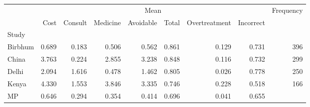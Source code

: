 \begin{table}[!h]
\centering
\begin{tabular}{lllllllll}
\cline{1-9}
\multicolumn{1}{c}{} &
  \multicolumn{7}{|c}{Mean} &
  \multicolumn{1}{r}{Frequency} \\
\multicolumn{1}{c}{} &
  \multicolumn{1}{|r}{Cost} &
  \multicolumn{1}{r}{Consult} &
  \multicolumn{1}{r}{Medicine} &
  \multicolumn{1}{r}{Avoidable} &
  \multicolumn{1}{r}{Total} &
  \multicolumn{1}{r}{Overtreatment} &
  \multicolumn{1}{r}{Incorrect} &
  \multicolumn{1}{r}{} \\
\cline{1-9}
\multicolumn{1}{l}{Study} &
  \multicolumn{1}{|r}{} &
  \multicolumn{1}{r}{} &
  \multicolumn{1}{r}{} &
  \multicolumn{1}{r}{} &
  \multicolumn{1}{r}{} &
  \multicolumn{1}{r}{} &
  \multicolumn{1}{r}{} &
  \multicolumn{1}{r}{} \\
\multicolumn{1}{l}{\hspace{1em}Birbhum} &
  \multicolumn{1}{|r}{0.689} &
  \multicolumn{1}{r}{0.183} &
  \multicolumn{1}{r}{0.506} &
  \multicolumn{1}{r}{0.562} &
  \multicolumn{1}{r}{0.861} &
  \multicolumn{1}{r}{0.129} &
  \multicolumn{1}{r}{0.731} &
  \multicolumn{1}{r}{396} \\
\multicolumn{1}{l}{\hspace{1em}China} &
  \multicolumn{1}{|r}{3.763} &
  \multicolumn{1}{r}{0.224} &
  \multicolumn{1}{r}{2.855} &
  \multicolumn{1}{r}{3.238} &
  \multicolumn{1}{r}{0.848} &
  \multicolumn{1}{r}{0.116} &
  \multicolumn{1}{r}{0.732} &
  \multicolumn{1}{r}{299} \\
\multicolumn{1}{l}{\hspace{1em}Delhi} &
  \multicolumn{1}{|r}{2.094} &
  \multicolumn{1}{r}{1.616} &
  \multicolumn{1}{r}{0.478} &
  \multicolumn{1}{r}{1.462} &
  \multicolumn{1}{r}{0.805} &
  \multicolumn{1}{r}{0.026} &
  \multicolumn{1}{r}{0.778} &
  \multicolumn{1}{r}{250} \\
\multicolumn{1}{l}{\hspace{1em}Kenya} &
  \multicolumn{1}{|r}{4.330} &
  \multicolumn{1}{r}{1.553} &
  \multicolumn{1}{r}{3.846} &
  \multicolumn{1}{r}{3.335} &
  \multicolumn{1}{r}{0.746} &
  \multicolumn{1}{r}{0.228} &
  \multicolumn{1}{r}{0.518} &
  \multicolumn{1}{r}{166} \\
\multicolumn{1}{l}{\hspace{1em}MP} &
  \multicolumn{1}{|r}{0.646} &
  \multicolumn{1}{r}{0.294} &
  \multicolumn{1}{r}{0.354} &
  \multicolumn{1}{r}{0.414} &
  \multicolumn{1}{r}{0.696} &
  \multicolumn{1}{r}{0.041} &
  \multicolumn{1}{r}{0.655} &

\end{tabular}
\end{table}
